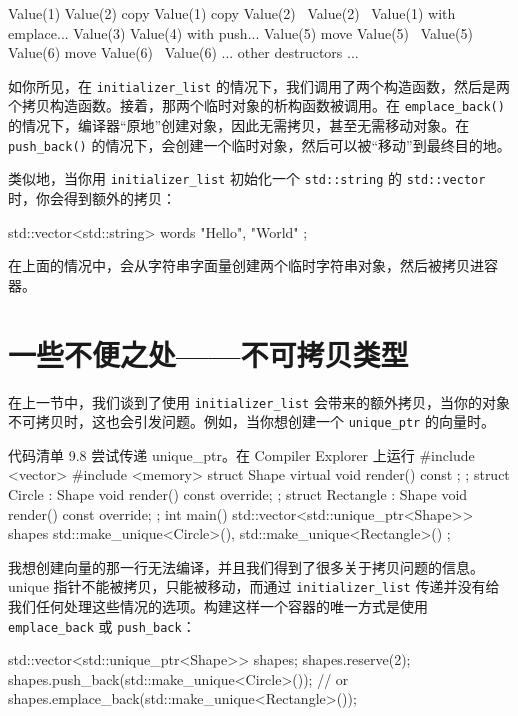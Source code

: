 \begin{codebox}[cpp]
Value(1)
Value(2)
copy Value(1)
copy Value(2)
~Value(2)
~Value(1)
with emplace...
Value(3)
Value(4)
with push...
Value(5)
move Value(5)
~Value(5)
Value(6)
move Value(6)
~Value(6)
... other destructors ...
\end{codebox}

如你所见，在 \texttt{initializer\_list} 的情况下，我们调用了两个构造函数，然后是两个拷贝构造函数。接着，那两个临时对象的析构函数被调用。在 \texttt{emplace\_back()} 的情况下，编译器“原地”创建对象，因此无需拷贝，甚至无需移动对象。在 \texttt{push\_back()} 的情况下，会创建一个临时对象，然后可以被“移动”到最终目的地。

类似地，当你用 \texttt{initializer\_list} 初始化一个 \texttt{std::string} 的 \texttt{std::vector} 时，你会得到额外的拷贝：

\begin{codebox}[cpp]
std::vector<std::string> words { "Hello", "World" };
\end{codebox}

在上面的情况中，会从字符串字面量创建两个临时字符串对象，然后被拷贝进容器。

\section{一些不便之处——不可拷贝类型}

在上一节中，我们谈到了使用 \texttt{initializer\_list} 会带来的额外拷贝，当你的对象不可拷贝时，这也会引发问题。例如，当你想创建一个 \texttt{unique\_ptr} 的向量时。

\begin{codeboxt}[cpp]{代码清单 9.8 尝试传递 unique\_ptr。在 Compiler Explorer 上运行}
#include <vector>
#include <memory>
struct Shape {
    virtual void render() const ; };
struct Circle : Shape { void render() const override; };
struct Rectangle : Shape {
    void render() const override; };
int main() {
    std::vector<std::unique_ptr<Shape>> shapes {
        std::make_unique<Circle>(), std::make_unique<Rectangle>()
    };
}
\end{codeboxt}

我想创建向量的那一行无法编译，并且我们得到了很多关于拷贝问题的信息。unique 指针不能被拷贝，只能被移动，而通过 \texttt{initializer\_list} 传递并没有给我们任何处理这些情况的选项。构建这样一个容器的唯一方式是使用 \texttt{emplace\_back} 或 \texttt{push\_back}：

\begin{codebox}[cpp]
std::vector<std::unique_ptr<Shape>> shapes;
shapes.reserve(2);
shapes.push_back(std::make_unique<Circle>());
// or
shapes.emplace_back(std::make_unique<Rectangle>());
\end{codebox}

